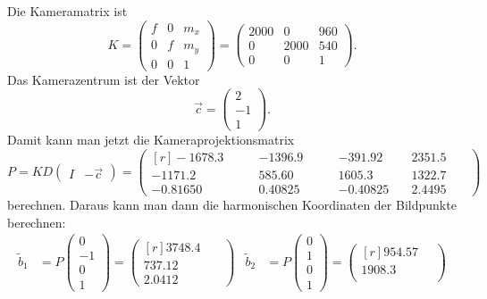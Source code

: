 \begin{loesung}
\begin{teilaufgaben}
\item
Die Kameramatrix ist
\[
K
=
\begin{pmatrix}
f&0&m_x\\
0&f&m_y\\
0&0&1
\end{pmatrix}
=
\begin{pmatrix}
2000&0&960\\
  0 &2000&540\\
0 & 0& 1
\end{pmatrix}.
\]
Das Kamerazentrum ist der Vektor
\[
\vec{c}= \begin{pmatrix}2\\-1\\1\end{pmatrix}.
\]
Damit kann man jetzt die Kameraprojektionsmatrix 
\[
P
=
K D \begin{pmatrix} I& -\vec{c}\end{pmatrix}
=
\begin{pmatrix*}[r]
-1678.3\phantom{0000}&-1396.9\phantom{0000}&-391.92\phantom{000}&  2351.5\phantom{000}\\
-1171.2\phantom{0000}&  585.60\phantom{000}&1605.3\phantom{0000}&  1322.7\phantom{000}\\
   -0.81650          &    0.40825          &  -0.40825          &     2.4495
\end{pmatrix*}
\]
berechnen.
Daraus kann man dann die harmonischen Koordinaten der Bildpunkte berechnen:
\begin{align*}
\tilde{b}_1
&=
P\begin{pmatrix}0\\-1\\0\\1\end{pmatrix}
=
\begin{pmatrix*}[r]
   3748.4\phantom{000}\\
   737.12\phantom{00}\\
   2.0412
\end{pmatrix*}
&
\tilde{b}_2
&=
P\begin{pmatrix}0\\1\\0\\1\end{pmatrix}
=
\begin{pmatrix*}[r]
   954.57\phantom{00}\\
   1908.3\phantom{000}\\

\end{pmatrix*}
\end{align*}
\end{teilaufgaben}
\end{loesung}
